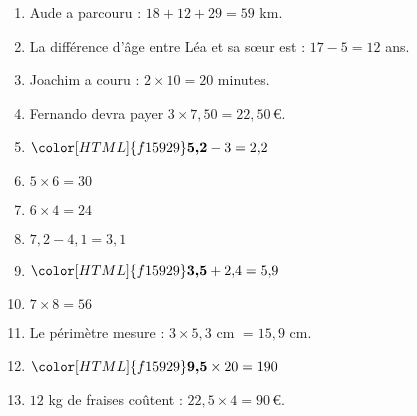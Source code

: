 \begin{Correction}
\begin{EXO}{}{}
\begin{multicols}{2}
\begin{enumerate}[itemsep=1em, label=\arabic*)]
\item \begin{minipage}[t]{\linewidth}Aude a parcouru : $18 + 12 + 29 = 59$ km.\end{minipage}
\item \begin{minipage}[t]{\linewidth}La différence d'âge entre Léa et sa sœur est : $17-5=12$ ans.\end{minipage}
\item \begin{minipage}[t]{\linewidth}Joachim a couru : $2 \times 10=20$ minutes.\end{minipage}
\item \begin{minipage}[t]{\linewidth}Fernando devra payer $3\times7{,}50=22{,}50$\,\euro{}.\end{minipage}
\item \begin{minipage}[t]{\linewidth}${\color[HTML]{f15929}\boldsymbol{5{,}2}} - 3=2{,}2$\end{minipage}
\item \begin{minipage}[t]{\linewidth}$5 \times 6=30$\end{minipage}
\item \begin{minipage}[t]{\linewidth}$6 \times 4=24$\end{minipage}
\item \begin{minipage}[t]{\linewidth}$7{,}2-4{,}1=3{,}1$\end{minipage}
\item \begin{minipage}[t]{\linewidth}${\color[HTML]{f15929}\boldsymbol{3{,}5}} + 2{,}4=5{,}9$\end{minipage}
\item \begin{minipage}[t]{\linewidth}$7 \times 8=56$\end{minipage}
\item \begin{minipage}[t]{\linewidth}Le périmètre mesure : $3 \times 5{,}3$ cm $=15{,}9$ cm.\end{minipage}
\item \begin{minipage}[t]{\linewidth}${\color[HTML]{f15929}\boldsymbol{9{,}5}} \times 20=190$\end{minipage}
\item \begin{minipage}[t]{\linewidth}$12$ kg de fraises coûtent : $22{,}5 \times 4 = 90$\,\euro{}.\end{minipage}

\end{enumerate}
\end{multicols}
\end{EXO}
\end{Correction}
